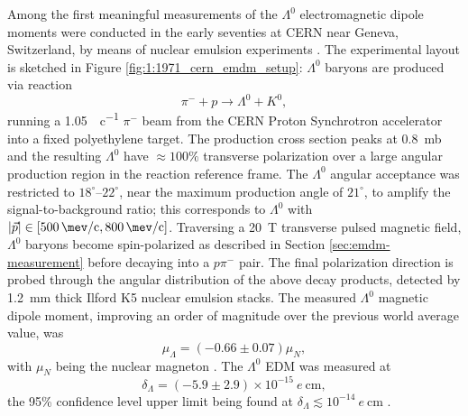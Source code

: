 Among the first meaningful measurements of the $\Lambda^0$ electromagnetic dipole moments were conducted in the early seventies at CERN near Geneva, Switzerland, by means of nuclear emulsion experiments \cite{1971_lambda_MDM} \cite{1971_lambda_EDM}.
The experimental layout is sketched in Figure \ref{fig:1:1971_cern_emdm_setup}: $\Lambda^0$ baryons are produced via reaction
\begin{equation}
	\pi^- + p \rightarrow \Lambda^0 + K^0,
\end{equation}
running a \SI{1.05}{\gev\per c} $\pi^-$ beam from the CERN Proton Synchrotron accelerator into a fixed polyethylene target.
The production cross section peaks at \SI{0.8}{\milli\barn} and the resulting $\Lambda^0$ have $\approx 100\%$ transverse polarization over a large angular production region in the reaction reference frame.
The $\Lambda^0$ angular acceptance was restricted to $18^\circ$--$22^\circ$, near the maximum production angle of $21^\circ$, to amplify the signal-to-background ratio;
this corresponds to $\Lambda^0$ with $|\vec{p}| \in \left[ \SI{500}{\mev\per c},\SI{800}{\mev\per c} \right]$.
Traversing a \SI{20}{\tesla} transverse pulsed magnetic field, $\Lambda^0$ baryons become spin-polarized as described in Section \ref{sec:emdm-measurement} before decaying into a $p\pi^-$ pair.
The final polarization direction is probed through the angular distribution of the above decay products, detected by \SI{1.2}{\milli\meter} thick Ilford K5 nuclear emulsion stacks.
The measured $\Lambda^0$ magnetic dipole moment, improving an order of magnitude over the previous world average value, was
\begin{equation}
\mu_\Lambda = \left( -0.66 \pm 0.07 \right) \mu_N,
\end{equation}
with $\mu_N$ being the nuclear magneton \cite{1971_lambda_MDM}. The $\Lambda^0$ EDM was measured at
\begin{equation}
\delta_\Lambda = \left( -5.9 \pm 2.9 \right)\times {10}^{-15}~e~\si{\centi\meter},
\end{equation}
the 95\% confidence level upper limit being found at $\delta_\Lambda \lesssim {10}^{-14}~e~\si{\centi\meter}$ \cite{1971_lambda_EDM}.

